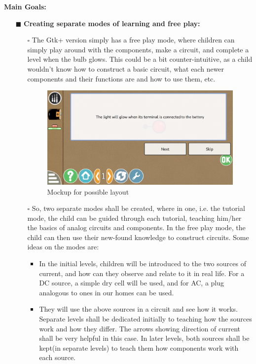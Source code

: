 \documentclass[preprint,12pt]{elsarticle}
\begin{document}
		\textbf{Main Goals:}
		\begin{itemize}
			\item[$\blacksquare$] \textbf{Creating separate modes of learning and free play:}
			\begin{itemize}
			\item[$\square$] {The Gtk+ version simply has a free play mode, where children can simply play around with the components, make a circuit, and complete a level when the bulb glows. This could be a bit counter-intuitive, as a child wouldn’t know how to construct a basic circuit, what each newer components and their functions are and how to use them, etc.}
			
			\begin{figure}[H]
			\centering\includegraphics[width=0.9\linewidth]{./images/gsoc1}
			\caption{Mockup for possible layout}
			\end{figure}
						
			\item[$\square$] {So, two separate modes shall be created, where in one, i.e. the tutorial mode, the child can be guided through each tutorial, teaching him/her the basics of analog circuits and components. In the free play mode, the child can then use their new-found knowledge to construct circuits. Some ideas on the modes are:}
			
					\begin{itemize}
					\item {In the initial levels, children will be introduced to the two sources of current, and how can they observe and relate to it in real life. For a DC source, a simple dry cell will be used, and for AC, a plug analogous to ones in our homes can be used.}
					
					\item {They will use the above sources in a circuit and see how it works. Separate levels shall be dedicated initially to teaching how the sources work and how they differ. The arrows showing direction of current shall be very helpful in this case. In later levels, both sources shall be kept(in separate levels) to teach them how components work with each source.}
					

\end{itemize}
\end{itemize}
\end{itemize}
\end{document}
